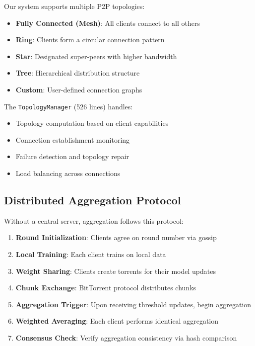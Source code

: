 \documentclass[11pt,conference]{article}
\begin{document}
Our system supports multiple P2P topologies:

\begin{itemize}
    \item \textbf{Fully Connected (Mesh)}: All clients connect to all others
    \item \textbf{Ring}: Clients form a circular connection pattern
    \item \textbf{Star}: Designated super-peers with higher bandwidth
    \item \textbf{Tree}: Hierarchical distribution structure
    \item \textbf{Custom}: User-defined connection graphs
\end{itemize}

The \texttt{TopologyManager} (526 lines) handles:
\begin{itemize}
    \item Topology computation based on client capabilities
    \item Connection establishment monitoring
    \item Failure detection and topology repair
    \item Load balancing across connections
\end{itemize}

\subsection{Distributed Aggregation Protocol}

Without a central server, aggregation follows this protocol:

\begin{enumerate}
    \item \textbf{Round Initialization}: Clients agree on round number via gossip
    \item \textbf{Local Training}: Each client trains on local data
    \item \textbf{Weight Sharing}: Clients create torrents for their model updates
    \item \textbf{Chunk Exchange}: BitTorrent protocol distributes chunks
    \item \textbf{Aggregation Trigger}: Upon receiving threshold updates, begin aggregation
    \item \textbf{Weighted Averaging}: Each client performs identical aggregation
    \item \textbf{Consensus Check}: Verify aggregation consistency via hash comparison
\end{enumerate}
\end{document}
